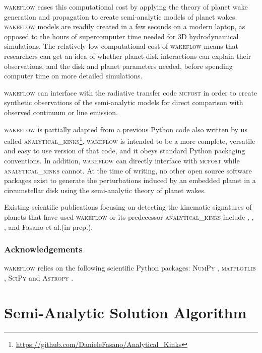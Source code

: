 \textsc{wakeflow} eases this computational cost by applying the theory of planet wake generation and propagation \citep{goldreich1979,goodman2001,rafikov2002a,bollati2021} to create semi-analytic models of planet wakes. 
\textsc{wakeflow} models are readily created in a few seconds on a modern laptop, as opposed to the hours of supercomputer time needed for 3D hydrodynamical simulations. 
The relatively low computational cost of \textsc{wakeflow} means that researchers can get an idea of whether planet-disk interactions can explain their observations, and the disk and planet parameters needed, before spending computer time on more detailed simulations.

\textsc{wakeflow} can interface with the radiative transfer code \textsc{mcfost} \citep{pinte2006,pinte2009} in order to create synthetic observations of the semi-analytic models for direct comparison with observed continuum or line emission.

\textsc{wakeflow} is partially adapted from a previous Python code also written by us called \textsc{analytical\_kinks}\footnote{\url{https://github.com/DanieleFasano/Analytical_Kinks}}.
\textsc{wakeflow} is intended to be a more complete, versatile and easy to use version of that code, and it obeys standard Python packaging conventions.
In addition, \textsc{wakeflow} can directly interface with \textsc{mcfost} while \textsc{analytical\_kinks} cannot.
At the time of writing, no other open source software packages exist to generate the perturbations induced by an embedded planet in a circumstellar disk using the semi-analytic theory of planet wakes.

Existing scientific publications focusing on detecting the kinematic signatures of planets that have used \textsc{wakeflow} or its predecessor \textsc{analytical\_kinks} include \citet{bollati2021}, \citet{calcino2022}, \citet{teague2022}, \citet{garg2022} and Fasano et al.(in prep.).

\subsubsection{Acknowledgements}

\textsc{wakeflow} relies on the following scientific Python packages: \textsc{NumPy} \citep{harris2020}, \textsc{matplotlib} \citep{hunter2007}, \textsc{SciPy} \citep{virtanen2020} and \textsc{Astropy} \citep{astropycollaboration2022}.

\section{Semi-Analytic Solution Algorithm}


